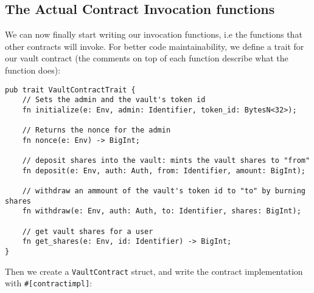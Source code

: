\documentclass{article}
\newcommand{\inl}[1]{\lstinline{#1}}
\begin{document}
\subsection{The Actual Contract Invocation functions}
We can now finally start writing our invocation functions, i.e the functions that other contracts will invoke. For better code maintainability, we define a trait for our vault contract (the comments on top of each function describe what the function does):

\begin{lstlisting}
pub trait VaultContractTrait {
    // Sets the admin and the vault's token id
    fn initialize(e: Env, admin: Identifier, token_id: BytesN<32>);

    // Returns the nonce for the admin
    fn nonce(e: Env) -> BigInt;

    // deposit shares into the vault: mints the vault shares to "from"
    fn deposit(e: Env, auth: Auth, from: Identifier, amount: BigInt);

    // withdraw an ammount of the vault's token id to "to" by burning shares
    fn withdraw(e: Env, auth: Auth, to: Identifier, shares: BigInt);

    // get vault shares for a user
    fn get_shares(e: Env, id: Identifier) -> BigInt;
}
\end{lstlisting}

Then we create a \inl{VaultContract} struct, and write the contract implementation with \inl{#[contractimpl]}:
\end{document}
